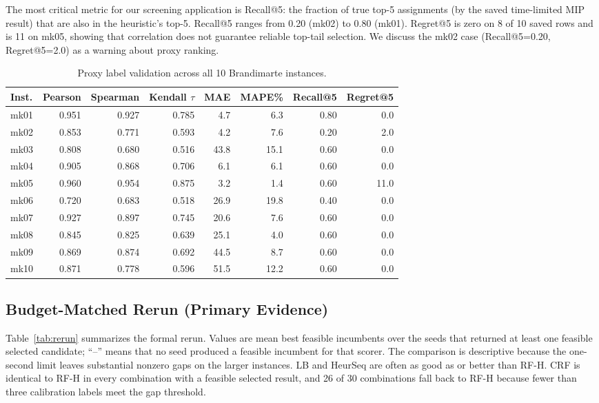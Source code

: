 \documentclass[12pt]{article}
\begin{document}
The most critical metric for our screening application is Recall@5: the fraction of true top-5 assignments (by the saved time-limited MIP result) that are also in the heuristic's top-5. Recall@5 ranges from 0.20 (mk02) to 0.80 (mk01). Regret@5 is zero on 8 of 10 saved rows and is 11 on mk05, showing that correlation does not guarantee reliable top-tail selection. We discuss the mk02 case (Recall@5=0.20, Regret@5=2.0) as a warning about proxy ranking.

\begin{table}[htbp]\centering\caption{Proxy label validation across all 10 Brandimarte instances.}\label{tab:proxy}
\begin{tabular}{lrrrrrrr}\toprule
Inst. & Pearson & Spearman & Kendall $\tau$ & MAE & MAPE\% & Recall@5 & Regret@5 \\ \midrule
mk01 & 0.951 & 0.927 & 0.785 & 4.7 & 6.3 & 0.80 & 0.0 \\
mk02 & 0.853 & 0.771 & 0.593 & 4.2 & 7.6 & 0.20 & 2.0 \\
mk03 & 0.808 & 0.680 & 0.516 & 43.8 & 15.1 & 0.60 & 0.0 \\
mk04 & 0.905 & 0.868 & 0.706 & 6.1 & 6.1 & 0.60 & 0.0 \\
mk05 & 0.960 & 0.954 & 0.875 & 3.2 & 1.4 & 0.60 & 11.0 \\
mk06 & 0.720 & 0.683 & 0.518 & 26.9 & 19.8 & 0.40 & 0.0 \\
mk07 & 0.927 & 0.897 & 0.745 & 20.6 & 7.6 & 0.60 & 0.0 \\
mk08 & 0.845 & 0.825 & 0.639 & 25.1 & 4.0 & 0.60 & 0.0 \\
mk09 & 0.869 & 0.874 & 0.692 & 44.5 & 8.7 & 0.60 & 0.0 \\
mk10 & 0.871 & 0.778 & 0.596 & 51.5 & 12.2 & 0.60 & 0.0 \\ \bottomrule
\end{tabular}
\end{table}

\subsection{Budget-Matched Rerun (Primary Evidence)}

Table~\ref{tab:rerun} summarizes the formal rerun. Values are mean best feasible incumbents over the seeds that returned at least one feasible selected candidate; ``--'' means that no seed produced a feasible incumbent for that scorer. The comparison is descriptive because the one-second limit leaves substantial nonzero gaps on the larger instances. LB and HeurSeq are often as good as or better than RF-H. CRF is identical to RF-H in every combination with a feasible selected result, and 26 of 30 combinations fall back to RF-H because fewer than three calibration labels meet the gap threshold.
\end{document}
